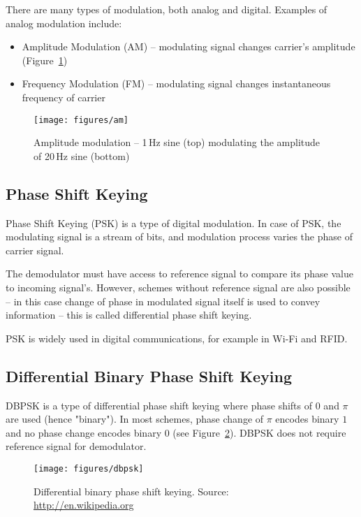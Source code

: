 There are many types of modulation, both analog and digital. Examples of analog modulation include:

\begin{itemize}
\item Amplitude Modulation (AM) -- modulating signal changes carrier's amplitude (Figure~\ref{fig:am})
\item Frequency Modulation (FM) -- modulating signal changes instantaneous frequency of carrier
\end{itemize}

\begin{figure}[h]
  \centering
  \texttt{[image: figures/am]}
  \caption[Amplitude modulation]{Amplitude modulation -- 1\,Hz sine (top) modulating the amplitude of 20\,Hz sine (bottom)}
  \label{fig:am}
\end{figure}

\subsection{Phase Shift Keying}

Phase Shift Keying (PSK) is a type of digital modulation. In case of PSK, the modulating signal is a stream of bits, and modulation process varies the phase of carrier signal.

The demodulator must have access to reference signal to compare its phase value to incoming signal's. However, schemes without reference signal are also possible -- in this case
change of phase in modulated signal itself is used to convey information -- this is called differential phase shift keying.

PSK is widely used in digital communications, for example in Wi-Fi and RFID. %

\subsection{Differential Binary Phase Shift Keying}
\label{subsec:dbpsk}

DBPSK is a type of differential phase shift keying where phase shifts of $0$ and $\pi$ are used (hence "binary"). In most schemes, phase change of $\pi$ encodes binary $1$
and no phase change encodes binary $0$ (see Figure~\ref{fig:dbpsk}). DBPSK does not require reference signal for demodulator.

\begin{figure}[h]
  \centering
  \texttt{[image: figures/dbpsk]}
  \caption[Differential binary phase shift keying]{Differential binary phase shift keying. Source: \url{http://en.wikipedia.org}}
  \label{fig:dbpsk}
\end{figure}

